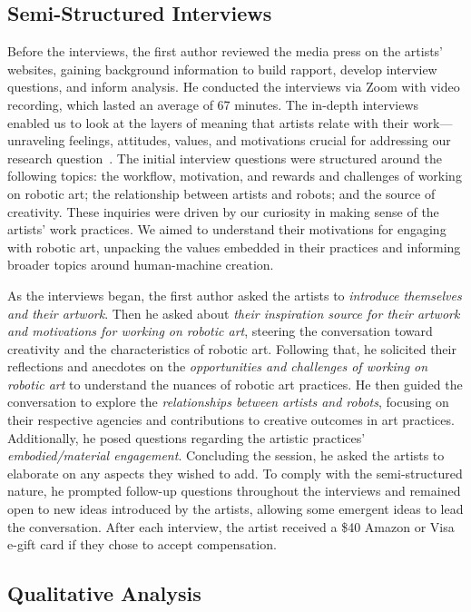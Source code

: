 \subsection{Semi-Structured Interviews}

Before the interviews, the first author reviewed the media press on the artists' websites, gaining background information to build rapport, develop interview questions, and inform analysis. He conducted the interviews via Zoom with video recording, which lasted an average of 67 minutes. The in-depth interviews enabled us to look at the layers of meaning that artists relate with their work---unraveling feelings, attitudes, values, and motivations crucial for addressing our research question~\cite{pugh2013good}. The initial interview questions were structured around the following topics: the workflow, motivation, and rewards and challenges of working on robotic art; the relationship between artists and robots; and the source of creativity. These inquiries were driven by our curiosity in making sense of the artists’ work practices. We aimed to understand their motivations for engaging with robotic art, unpacking the values embedded in their practices and informing broader topics around human-machine creation. 

As the interviews began, the first author asked the artists to \textit{introduce themselves and their artwork}. Then he asked about \textit{their inspiration source for their artwork and motivations for working on robotic art}, steering the conversation toward creativity and the characteristics of robotic art. Following that, he solicited their reflections and anecdotes on the \textit{opportunities and challenges of working on robotic art} to understand the nuances of robotic art practices. He then guided the conversation to explore the \textit{relationships between artists and robots}, focusing on their respective agencies and contributions to creative outcomes in art practices. Additionally, he posed questions regarding the artistic practices' \textit{embodied/material engagement}. Concluding the session, he asked the artists to elaborate on any aspects they wished to add. To comply with the semi-structured nature, he prompted follow-up questions throughout the interviews and remained open to new ideas introduced by the artists, allowing some emergent ideas to lead the conversation. After each interview, the artist received a \$40 Amazon or Visa e-gift card if they chose to accept compensation.

\subsection{Qualitative Analysis}

